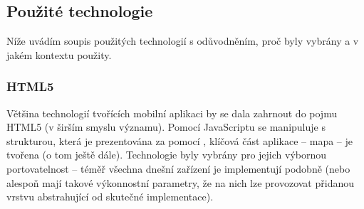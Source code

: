 % 
% 
% 
% 
% 
% 
% 
% 
% 
% 



\subsection{Použité technologie}
Níže uvádím soupis použitých technologií s odůvodněním, proč byly vybrány a v jakém kontextu použity.

\subsubsection{HTML5}
Většina technologií tvořících mobilní aplikaci by se dala zahrnout do pojmu HTML5 (v širším smyslu významu). Pomocí JavaScriptu se manipuluje s  strukturou, která je prezentována za pomocí , klíčová část aplikace -- mapa -- je tvořena  (o tom ještě dále). Technologie byly vybrány pro jejich výbornou portovatelnost -- téměř všechna dnešní zařízení je implementují podobně (nebo alespoň mají takové výkonnostní parametry, že na nich lze provozovat přidanou vrstvu abstrahující od skutečné implementace).

